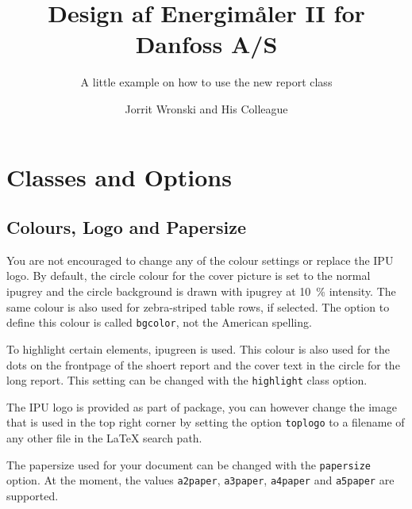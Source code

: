 \documentclass[short,comm,dots]{ipureport}
\title{Design af Energimåler II for Danfoss A/S}
\subtitle{A little example on how to use the new report class}
\author{Jorrit Wronski and His Colleague}
\begin{document}


\maketitle



\tableofcontents
\listoftodos

\cleardoublepage
\section{Classes and Options}

\subsection{Colours, Logo and Papersize}

You are not encouraged to change any of the colour settings or replace the IPU logo. By default, the circle colour for the cover picture is set to the normal ipugrey and the circle background is drawn with ipugrey at \SI{10}{\percent} intensity. The same colour is also used for zebra-striped table rows, if selected. The option to define this colour is called \texttt{bgcolor}, not the American spelling. 

To highlight certain elements, ipugreen is used. This colour is also used for the dots on the frontpage of the shoert report and the cover text in the circle for the long report. This setting can be changed with the \texttt{highlight} class option.

The IPU logo is provided as part of package, you can however change the image that is used in the top right corner by setting the option \texttt{toplogo} to a filename of any other file in the \LaTeX{} search path. 


The papersize used for your document can be changed with the \texttt{papersize} option. At the moment, the values \texttt{a2paper}, \texttt{a3paper}, \texttt{a4paper} and \texttt{a5paper} are supported. 
\end{document}
